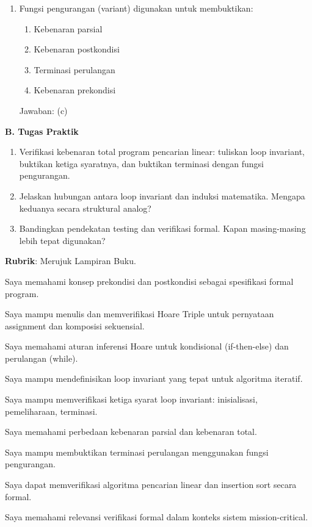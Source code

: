\documentclass[../main]{subfiles}
\begin{document}
\begin{asesmen}
\begin{enumerate}
  \item Fungsi pengurangan (variant) digunakan untuk membuktikan:
  \begin{enumerate}
    \item Kebenaran parsial
    \item Kebenaran postkondisi
    \item Terminasi perulangan
    \item Kebenaran prekondisi
  \end{enumerate}
  Jawaban: (c)
\end{enumerate}

\textbf{B. Tugas Praktik}
\begin{enumerate}
  \item Verifikasi kebenaran total program pencarian linear: tuliskan loop invariant, buktikan ketiga syaratnya, dan buktikan terminasi dengan fungsi pengurangan.
  \item Jelaskan hubungan antara loop invariant dan induksi matematika. Mengapa keduanya secara struktural analog?
  \item Bandingkan pendekatan testing dan verifikasi formal. Kapan masing-masing lebih tepat digunakan?
\end{enumerate}

\textbf{Rubrik}: Merujuk Lampiran Buku.
\end{asesmen}


\begin{checklist}
  \item Saya memahami konsep prekondisi dan postkondisi sebagai spesifikasi formal program.
  \item Saya mampu menulis dan memverifikasi Hoare Triple untuk pernyataan assignment dan komposisi sekuensial.
  \item Saya memahami aturan inferensi Hoare untuk kondisional (if-then-else) dan perulangan (while).
  \item Saya mampu mendefinisikan loop invariant yang tepat untuk algoritma iteratif.
  \item Saya mampu memverifikasi ketiga syarat loop invariant: inisialisasi, pemeliharaan, terminasi.
  \item Saya memahami perbedaan kebenaran parsial dan kebenaran total.
  \item Saya mampu membuktikan terminasi perulangan menggunakan fungsi pengurangan.
  \item Saya dapat memverifikasi algoritma pencarian linear dan insertion sort secara formal.
  \item Saya memahami relevansi verifikasi formal dalam konteks sistem mission-critical.
\end{checklist}
\end{document}
